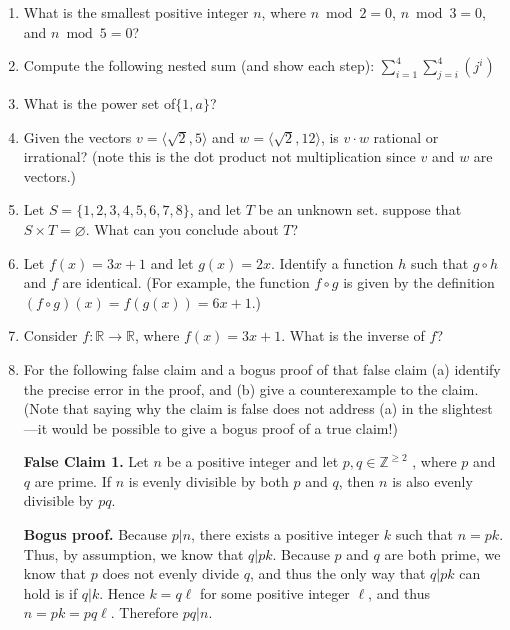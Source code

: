 \documentclass[11pt, oneside]{article}   	%
\let\emptyset\varnothing
\newcommand{\ints}{\mathbb{Z}}
\begin{document}
\begin{enumerate}
\item What is the smallest positive integer $n$, where $n\bmod 2=0$, $n\bmod3=0$, and $n\bmod5=0$?

\item Compute the following nested sum (and show each step): $\displaystyle \sum_{i=1}^4\sum_{j=i}^4 \left(j^i\right)$


\item What is the power set of$\{1,a\}$?

\item 
Given the vectors $v = \langle \sqrt{2}, 5\rangle$ and $w = \langle \sqrt{2}, 12\rangle$, 
is $v \cdot w$ rational or irrational? 
(note this is the dot product not multiplication since $v$ and $w$ are vectors.)

\item Let $S = \{1,2,3,4,5,6,7,8\}$, and let $T$ be an unknown set.
suppose that $S\times T=\emptyset$.
What can you conclude about $T$?

\item Let $f(x)=3x+1$ and let $g(x)=2x$. 
Identify a function $h$ such that $g\circ h$ and $f$ are identical.
(For example, the function $f \circ g$ is given by the definition $(f \circ g)(x) = f(g(x)) = 6x + 1$.)

\item Consider $f:\mathbb{R}\rightarrow\mathbb{R}$, where $f(x)=3x+1$.
What is the inverse of $f$?

\item For the following false claim and a bogus proof of that false claim 
(a) identify the precise error in the proof, and 
(b) give a counterexample to the claim. 
(Note that saying why the claim is false does not address (a) in the slightest—it would be possible to give a bogus proof of a true claim!)

\textbf{False Claim 1.} 
Let $n$ be a positive integer and let $p, q \in \ints^{\ge2}$ , where $p$ and $q$ are prime. 
If $n$ is evenly divisible by
both $p$ and $q$, then $n$ is also evenly divisible by $pq$.

\textbf{Bogus proof.} 
Because $p | n$, there exists a positive integer $k$ such that $n = pk$. 
Thus, by assumption, we know that $q | pk$. 
Because $p$ and $q$ are both prime, 
we know that $p$ does not evenly divide $q$, and thus the only way that $q | pk$ can hold is if $q | k$. 
Hence $k = q\ell$ for some positive integer $\ell$, and thus $n = pk = pq\ell$. 
Therefore $pq | n$.


\end{enumerate}
\end{document}
